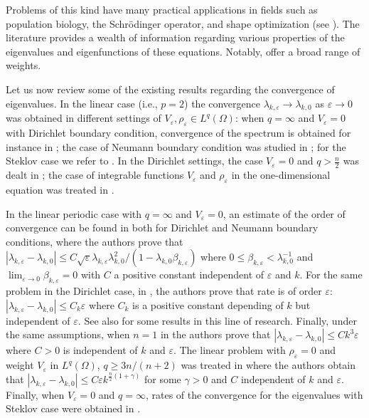 \documentclass[12pt]{amsart}
\theoremstyle{definition}
\theoremstyle{remark}
\numberwithin{equation}{section}
\begin{document}
Problems of this kind have many practical applications in fields such as population biology, the Schr\"odinger operator, and shape optimization (see \cite{A, LY, OSY}). The literature provides a wealth of information regarding various properties of the eigenvalues and eigenfunctions of these equations. Notably, \cite{BH, CR} offer a broad range of weights.

Let us now review some of the existing results regarding the convergence of eigenvalues.  In the linear case (i.e., $p=2$) the convergence $\lambda_{k,\varepsilon}\to \lambda_{k,0}$ as $\varepsilon\to 0$ was obtained in different settings of $V_\varepsilon,\rho_\varepsilon\in L^q(\Omega)$: when $q=\infty$ and $V_\varepsilon=0$ with Dirichlet boundary condition, convergence of the spectrum is obtained for instance in \cite{A}; the case of Neumann boundary condition was studied in \cite{LY}; for the Steklov case we refer to \cite{S}. In the Dirichlet settings, the case $V_\varepsilon=0$ and $q>\frac{n}{2}$ was dealt in \cite{WYZ}; the case of integrable functions $V_\varepsilon$ and $\rho_\varepsilon$ in the one-dimensional equation was treated in \cite{CQ}.


In the linear periodic case with $q=\infty$ and $V_\varepsilon=0$, an estimate of the order of convergence can be found in \cite{OSY} both for Dirichlet and Neumann boundary conditions, where the authors prove that $|\lambda_{k,\varepsilon} - \lambda_{k,0}| \leq C\sqrt{\varepsilon} \lambda_{k,\varepsilon} \lambda_{k,0}^2 /(1-\lambda_{k,0}\beta_{k,\varepsilon})$ where $0\leq \beta_{k,\varepsilon}<\lambda_{k,0}^{-1}$ and  $\lim_{\varepsilon\to 0}\beta_{k,\varepsilon}=0$  with $C$ a positive constant independent of $\varepsilon$ and $k$. For the same problem in the Dirichlet case, in \cite{SV}, the authors prove that rate is of order $\varepsilon$: $|\lambda_{k,\varepsilon} - \lambda_{k,0}| \leq C_k \varepsilon$ where $C_k$ is a positive constant depending of $k$ but independent of $\varepsilon$. See also \cite{KLS} for some results in this line of research. Finally, under the same assumptions, when  $n=1$ in \cite{CZ} the authors prove that
$|\lambda_{k,\varepsilon} - \lambda_{k,0}| \leq C k^3 \varepsilon$ where $C>0$ is independent of $k$ and $\varepsilon$. The linear problem with $\rho_\varepsilon=0$ and weight $V_\varepsilon$ in $L^q(\Omega)$, $q\geq  3n/(n+2)$ was treated in \cite{WZ} where the authors obtain that $|\lambda_{k,\varepsilon}-\lambda_{k,0}|\leq C\varepsilon k^{\frac{n}{2}(1+\gamma)}$ for some $\gamma>0$ and $C$ independent of $k$ and $\varepsilon$. Finally, when $V_\varepsilon=0$ and $q=\infty$, rates of the convergence for the eigenvalues with  Steklov case were obtained in \cite{S}.
\end{document}
